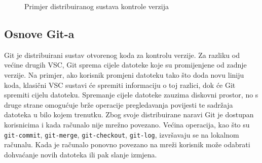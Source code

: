 \begin{figure}[h]

    \caption{Primjer distribuiranog sustava kontrole verzija}%
    \label{fig:02DVCS}
\end{figure}

\subsection{Osnove Git-a}
Git je distribuirani sustav otvorenog koda za kontrolu verzije. Za razliku od većine drugih VSC, Git
sprema cijele datoteke koje su promijenjene od zadnje verzije. Na primjer, ako korisnik promjeni
datoteku tako što doda novu liniju koda, klasični VSC sustavi će spremiti informaciju o toj razlici,
dok će Git spremiti cijelu datoteku. Spremanje cijele datoteke zauzima diskovni prostor, no s druge
strane omogućuje brže operacije pregledavanja povijesti te sadržaja datoteka u bilo kojem trenutku.
Zbog svoje distribuirane naravi Git je dostupan korisnicima i kada računalo nije mrežno povezano.
Većina operacija, kao što su \texttt{git-commit}, \texttt{git-merge}, \texttt{git-checkout},
\texttt{git-log}, izvršavaju se na lokalnom računalu. Kada je računalo ponovno povezano na mreži
korisnik može odabrati dohvaćanje novih datoteka ili pak slanje izmjena.

